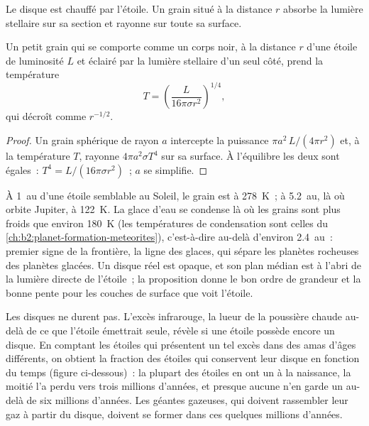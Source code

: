 Le disque est chauffé par l'étoile. Un grain situé à la distance $r$ absorbe la
lumière stellaire sur sa section et rayonne sur toute sa surface.

\begin{proposition}
\label{prop:b2:ism-star-formation:grain}
Un petit grain qui se comporte comme un corps noir, à la distance $r$ d'une étoile de
luminosité $L$ et éclairé par la lumière stellaire d'un seul côté, prend la température
\[
  T = \left(\frac{L}{16\pi\sigma r^2}\right)^{1/4},
\]
qui décroît comme $r^{-1/2}$.
\end{proposition}

\begin{proof}
Un grain sphérique de rayon $a$ intercepte la puissance $\pi a^2\,L/(4\pi r^2)$
et, à la température $T$, rayonne $4\pi a^2\sigma T^4$ sur sa surface. À l'équilibre les deux sont égales~: $T^4 = L/(16\pi\sigma r^2)$~; $a$ se
simplifie.
\end{proof}

À \qty{1}{au} d'une étoile semblable au Soleil, le grain est à \qty{278}{K}~; à
\qty{5.2}{au}, là où orbite Jupiter, à \qty{122}{K}. La glace d'eau se condense là où les grains sont plus froids que environ \qty{180}{K} (les températures de condensation
sont celles du \cref{ch:b2:planet-formation-meteorites}), c'est-à-dire au-delà d'environ \qty{2.4}{au}~: premier signe de la frontière, la ligne des glaces, qui sépare les planètes rocheuses des planètes glacées. Un disque réel est opaque, et son plan médian est à
l'abri de la lumière directe de l'étoile~; la proposition donne le bon ordre de grandeur et la bonne pente pour les couches de
surface
que
voit
l'étoile.

Les disques ne durent pas. L'excès infrarouge, la lueur de la poussière chaude au-delà de ce que
l'étoile émettrait seule, révèle si une étoile possède encore un disque. En comptant les étoiles qui présentent un tel excès dans des amas d'âges différents, on obtient la fraction des étoiles qui
conservent leur disque en fonction du temps (figure ci-dessous)~: la plupart des étoiles en ont un à la naissance, la moitié l'a perdu vers trois millions d'années, et presque aucune n'en garde un au-delà de six millions d'années. Les géantes gazeuses, qui doivent rassembler leur gaz à partir du disque,
doivent se former dans ces
quelques
millions
d'années.

